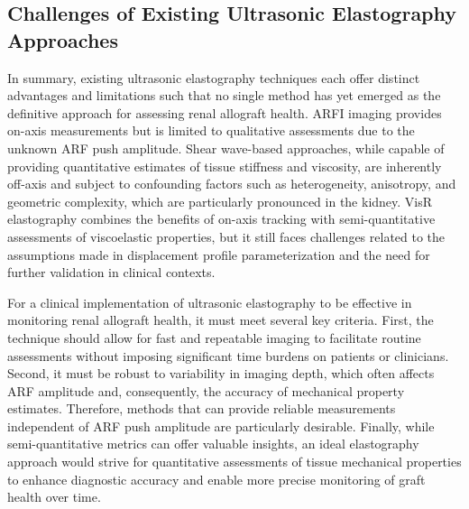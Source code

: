 \subsection{Challenges of Existing Ultrasonic Elastography Approaches}


In summary, existing ultrasonic elastography techniques each offer distinct advantages and limitations such that no single method has yet emerged as the definitive approach for assessing renal allograft health. ARFI imaging provides on-axis measurements but is limited to qualitative assessments due to the unknown ARF push amplitude. Shear wave-based approaches, while capable of providing quantitative estimates of tissue stiffness and viscosity, are inherently off-axis and subject to confounding factors such as heterogeneity, anisotropy, and geometric complexity, which are particularly pronounced in the kidney. VisR elastography combines the benefits of on-axis tracking with semi-quantitative assessments of viscoelastic properties, but it still faces challenges related to the assumptions made in displacement profile parameterization and the need for further validation in clinical contexts.


For a clinical implementation of ultrasonic elastography to be effective in monitoring renal allograft health, it must meet several key criteria. First, the technique should allow for fast and repeatable imaging to facilitate routine assessments without imposing significant time burdens on patients or clinicians. Second, it must be robust to variability in imaging depth, which often affects ARF amplitude and, consequently, the accuracy of mechanical property estimates. Therefore, methods that can provide reliable measurements independent of ARF push amplitude are particularly desirable. Finally, while semi-quantitative metrics can offer valuable insights, an ideal elastography approach would strive for quantitative assessments of tissue mechanical properties to enhance diagnostic accuracy and enable more precise monitoring of graft health over time.

